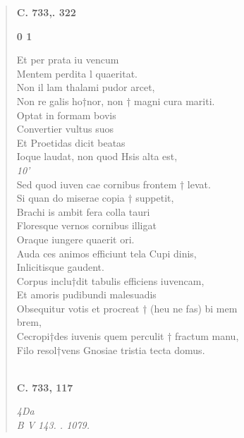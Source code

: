 \documentclass[11pt, a4paper]{report}
\begin{document}
\begin{verse}
    \begin{center} \textbf{C. 733,. 322} \end{center}\begin{center} \textbf{0 1} \end{center}Et per  \lbrack  prata iu vencum  \rbrack  \\ Mentem  \lbrack  perdita l quaeritat.  \rbrack  \\ Non il \lbrack lam thalami pudor  \rbrack  arcet, \\ Non re galis ho†nor, non † magni  \lbrack  cura mariti. \\ Optat in  \lbrack  formam  \lbrack  bovis \\ Convertier vultus  \rbrack  suos  \rbrack  \\ Et Proetidas  \lbrack  dicit beatas  \rbrack  \\ Ioque laudat, non  \lbrack  quod Hsis alta est, \\ \textit{10’} \\ Sed quod  \lbrack  iuven cae cornibus  \lbrack  frontem † levat. \rbrack  \\ Si quan \lbrack do miserae copia † suppetit, \\ Brachi is ambit fera  \lbrack  colla  \lbrack  tauri \\ Floresque vernos  \rbrack  cornibus illigat  \rbrack  \\ Oraque iungere quaerit ori.  \rbrack  \\ Auda ces animos efficiunt tela Cupi \lbrack dinis, \\ Inlicitisque gaudent.  \rbrack  \\ Corpus inclu†dit tabulis efficiens iuvencam,  \rbrack  \\ Et amoris  \rbrack  pudibundi malesuadis \\ Obsequitur votis et  \lbrack  procreat † (heu ne fas) bi mem \\ brem, \rbrack  \\ Cecropi†des iuvenis quem perculit † fractum  \lbrack  manu, \\ Filo  \lbrack  resol†vens Gnosiae tristia tecta domus.  \rbrack  \\ 
        ﻿\pagebreak 
     \marginpar{[218]} \begin{center} \textbf{C. 733, 117} \end{center}\textit{4Da} \\ \textit{B V 143. . 1079.} \\ 
      \end{verse}
  
\end{document}
